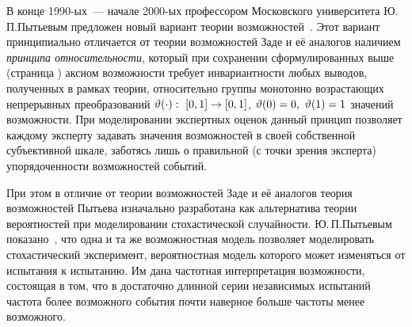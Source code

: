 В конце 1990-ых~--- начале 2000-ых профессором Московского университета Ю.\,П.\;Пытьевым предложен новый вариант теории возможностей~\cite{possbook, cit:smf, probbook, pytyev_experts}. Этот вариант принципиально отличается от теории возможностей Заде и её аналогов наличием \emph{принципа относительности}, который при сохранении сформулированных выше (страница \pageref{axiom_P1}) аксиом возможности требует инвариантности любых выводов, полученных в рамках теории, относительно группы монотонно возрастающих непрерывных преобразований $\vartheta(\cdot):\ [0,1]\to[0,1]$, $\vartheta(0) = 0,\ \vartheta(1) = 1$ значений возможности. При моделировании экспертных оценок данный принцип позволяет каждому эксперту задавать значения возможностей в своей собственной субъективной шкале, заботясь лишь о правильной (с точки зрения эксперта) упорядоченности возможностей событий.

\begin{notice}
При этом в отличие от теории возможностей Заде и её аналогов теория возможностей Пытьева изначально разработана как альтернатива теории вероятностей при моделировании стохастической случайности.
Ю.\,П.\;Пытьевым показано~\cite{possbook2}, что одна и та же возможностная модель позволяет моделировать стохастический эксперимент, вероятностная модель которого может изменяться от испытания к испытанию.  Им дана частотная интерпретация возможности, состоящая в том, что в достаточно длинной серии независимых испытаний частота более возможного события почти наверное больше частоты менее возможного. 
\end{notice}

